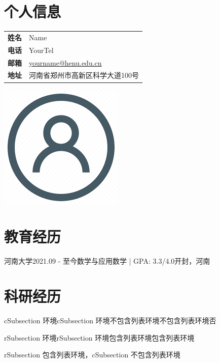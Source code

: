 \documentclass{HENU-CV}
\begin{document}
\section{个人信息}
\begin{minipage}{0.75\textwidth}
        \begin{tabular}{ll}
        \textbf{姓名} & Name          \\
        \textbf{电话} & YourTel       \\
        \textbf{邮箱} & \href{mailto:yourname@henu.edu.cn}{yourname@henu.edu.cn} \\
        \textbf{地址} & 河南省郑州市高新区科学大道100号      
        \end{tabular}
\end{minipage}
\hfill
\begin{minipage}{0.3\textwidth}
    \includegraphics[height=0.4\textwidth]{images/avatar.png}
\end{minipage}
\section{教育经历}

\begin{cSubsection}{河南大学}{2021.09 - 至今}{数学与应用数学 | GPA: 3.3/4.0}{开封，河南}
\end{cSubsection}


\section{科研经历}
\begin{cSubsection}{cSubsection 环境}{cSubsection 环境}{不包含列表环境}{不包含列表环境否}
\end{cSubsection}

\begin{rSubsection}{rSubsection 环境}{rSubsection 环境}{包含列表环境}{包含列表环境}
    \item rSubsection 包含列表环境，cSubsection 不包含列表环境
\end{rSubsection}
\end{document}
